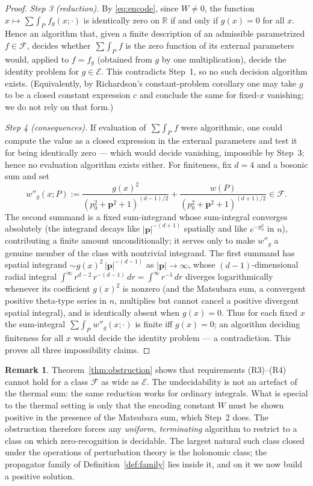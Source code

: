 \documentclass{amsart}
\theoremstyle{definition}
\newtheorem{remark}{Remark}
\begin{document}
\begin{proof}
\emph{Step 3 (reduction).}
By \eqref{eq:encode}, since $W\neq0$, the function
$x\mapsto\mathop{\sum\!\!\int}_P f_g(x;\cdot)$ is identically zero on
$\mathbb R$ if and only if $g(x)=0$ for all $x$. Hence an algorithm that, given
a finite description of an admissible parametrized $f\in\mathcal F$, decides
whether $\mathop{\sum\!\!\int}_P f$ is the zero function of its external
parameters would, applied to $f=f_g$ (obtained from $g$ by one multiplication),
decide the identity problem for $g\in\mathcal E$. This contradicts Step~1, so no
such decision algorithm exists. (Equivalently, by Richardson's constant-problem
corollary one may take $g$ to be a closed constant expression $c$ and conclude
the same for fixed-$x$ vanishing; we do not rely on that form.)

\emph{Step 4 (consequences).}
If evaluation of $\mathop{\sum\!\!\int}_P f$ were algorithmic, one could compute
the value as a closed expression in the external parameters and test it for
being identically zero --- which would decide vanishing, impossible by Step~3;
hence no evaluation algorithm exists either. For finiteness, fix $d=4$ and a
bosonic sum and set
\[
  w''_g(x;P):=\frac{g(x)^2}{(p_0^2+\mathbf p^2+1)^{(d-1)/2}}
            +\frac{w(P)}{(p_0^2+\mathbf p^2+1)^{(d+1)/2}}\in\mathcal F .
\]
The second summand is a fixed sum-integrand whose sum-integral converges
absolutely (the integrand decays like $|\mathbf p|^{-(d+1)}$ spatially and like
$e^{-p_0^2}$ in $n$), contributing a finite amount unconditionally; it serves
only to make $w''_g$ a genuine member of the class with nontrivial integrand.
The first summand has spatial integrand $\sim g(x)^2\,|\mathbf p|^{-(d-1)}$ as
$|\mathbf p|\to\infty$, whose $(d-1)$-dimensional radial integral
$\int^\infty r^{d-2}\,r^{-(d-1)}\,dr=\int^\infty r^{-1}\,dr$ diverges
logarithmically whenever its coefficient $g(x)^2$ is nonzero (and the Matsubara
sum, a convergent positive theta-type series in $n$, multiplies but cannot
cancel a positive divergent spatial integral), and is identically absent when
$g(x)=0$. Thus for each fixed $x$ the sum-integral $\mathop{\sum\!\!\int}_P
w''_g(x;\cdot)$ is finite iff $g(x)=0$; an algorithm deciding finiteness for all
$x$ would decide the identity problem --- a contradiction. This proves all three
impossibility claims.
\end{proof}

\begin{remark}
Theorem~\ref{thm:obstruction} shows that requirements (R3)--(R4) cannot hold
for a class $\mathcal F$ as wide as $\mathcal E$. The undecidability is not an
artefact of the thermal sum: the same reduction works for ordinary integrals.
What is special to the thermal setting is only that the encoding constant $W$
must be shown positive in the presence of the Matsubara sum, which Step~2 does.
The obstruction therefore forces any \emph{uniform, terminating} algorithm to
restrict to a class on which zero-recognition is decidable. The largest
natural such class closed under the operations of perturbation theory is the
holonomic class; the propagator family of Definition~\ref{def:family} lies
inside it, and on it we now build a positive solution.
\end{remark}
\end{document}
